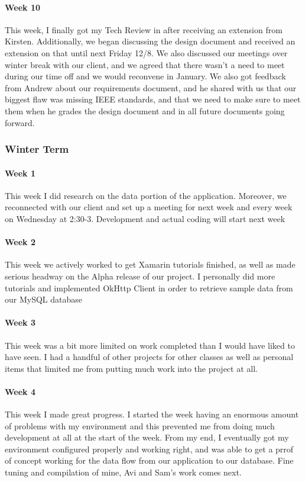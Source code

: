 \documentclass[onecolumn, draftclsnofoot,10pt, compsoc]{IEEEtran}
\begin{document}
\paragraph{Week 10}
This week, I finally got my Tech Review in after receiving an extension from Kirsten. Additionally, we began discussing the design document and received an extension on that until next Friday 12/8. We also discussed our meetings over winter break with our client, and we agreed that there wasn't a need to meet during our time off and we would reconvene in January. We also got feedback from Andrew about our requirements document, and he shared with us that our biggest flaw was missing IEEE standards, and that we need to make sure to meet them when he grades the design document and in all future documents going forward. 

\subsubsection{Winter Term}
\paragraph{Week 1}
This week I did research on the data portion of the application. Moreover, we reconnected with our client and set up a meeting for next week and every week on Wednesday at 2:30-3. Development and actual coding will start next week
\paragraph{Week 2}
This week we actively worked to get Xamarin tutorials finished, as well as made serious headway on the Alpha release of our project.  I personally did more tutorials and implemented OkHttp Client in order to retrieve sample data from our MySQL database
\paragraph{Week 3}
This week was a bit more limited on work completed than I would have liked to have seen. I had a handful of other projects for other classes as well as personal items that limited me from putting much work into the project at all.
\paragraph{Week 4}
This week I made great progress. I started the week having an enormous amount of problems with my environment and this prevented me from doing much development at all at the start of the week. From my end, I eventually got my environment configured properly and working right, and was able to get a prrof of concept working for the data flow from our application to our database. Fine tuning and compilation of mine, Avi and Sam's work comes next.
\end{document}
